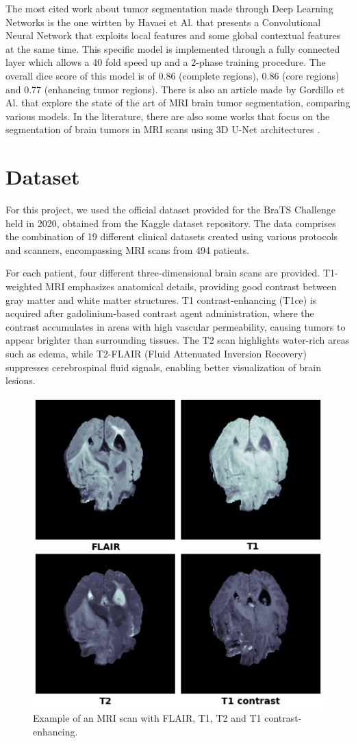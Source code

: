 \documentclass[10pt,twocolumn,letterpaper]{article}
\begin{document}
The most cited work about tumor segmentation made through Deep Learning Networks is the one wirtten by Havaei et Al.\cite{HAVAEI201718} that presents a Convolutional Neural Network that exploits local features and some global contextual features at the same time. This specific model is implemented through a fully connected layer which allows a 40 fold speed up and a 2-phase training procedure. The overall dice score of this model is of 0.86 (complete regions), 0.86 (core regions) and 0.77 (enhancing tumor regions).
There is also an article made by Gordillo et Al.\cite{GORDILLO20131426} that explore the state of the art of MRI brain tumor segmentation, comparing various models.
In the literature, there are also some works that focus on the segmentation of brain tumors in MRI scans using 3D U-Net architectures \cite{dong2017automatic,bukhari2021e1d3,myronenko2019robust}.


\section{Dataset}
For this project, we used the official dataset\cite{BraTSdataset} provided for the BraTS Challenge held in 2020, obtained from the Kaggle dataset repository. The data comprises the combination of 19 different clinical datasets created using various protocols and scanners, encompassing MRI scans from 494 patients.

For each patient, four different three-dimensional brain scans are provided. T1-weighted MRI emphasizes anatomical details, providing good contrast between gray matter and white matter structures. T1 contrast-enhancing (T1ce) is acquired after gadolinium-based contrast agent administration, where the contrast accumulates in areas with high vascular permeability, causing tumors to appear brighter than surrounding tissues. The T2 scan highlights water-rich areas such as edema, while T2-FLAIR (Fluid Attenuated Inversion Recovery) suppresses cerebrospinal fluid signals, enabling better visualization of brain lesions.

\begin{figure}[H]
\centering
\includegraphics[width=0.55\linewidth]{img/example_MRI.png}
\caption{Example of an MRI scan with FLAIR, T1, T2 and T1 contrast-enhancing.}
\end{figure}
\end{document}
